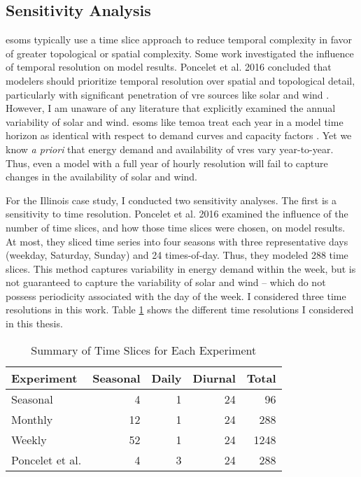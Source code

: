 \subsection{Sensitivity Analysis}

\glspl{esom} typically use a time slice approach to reduce temporal complexity
in favor of greater topological or spatial complexity. Some work investigated the
influence of temporal resolution on model results. Poncelet et al. 2016
concluded that modelers should prioritize temporal resolution over spatial and
topological detail, particularly with significant penetration of \gls{vre}
sources like solar and wind \cite{poncelet_impact_2016}. However,
I am unaware of any literature that explicitly examined the annual variability
of solar and wind. \glspl{esom} like \gls{temoa} treat each year in a model
time horizon as identical with respect to demand curves and capacity factors
\cite{hunter_modeling_2013}. Yet
we know \textit{a priori} that energy demand and availability of \glspl{vre}
vary year-to-year. Thus, even a model with a full year of hourly resolution
will fail to capture changes in the availability of solar and wind.

For the Illinois case study, I conducted two sensitivity analyses. The first is a
sensitivity to time resolution. Poncelet et al. 2016 examined the influence of
the number of time slices, and how those time slices were chosen, on model results.
At most, they sliced time series into four seasons with three representative days (weekday,
Saturday, Sunday) and 24 times-of-day. Thus, they modeled 288 time slices. This
method captures variability in energy demand within the week, but is not guaranteed
to capture the variability of solar and wind -- which do not possess periodicity
associated with the day of the week. I considered three time resolutions in this work.
Table \ref{tab:time-slice} shows the different time resolutions I considered in this thesis.

\begin{table}[H]
  \centering
  \caption{Summary of Time Slices for Each Experiment}
  \label{tab:time-slice}
  \begin{tabular}{lrrrr}
    \toprule
    Experiment & Seasonal & Daily & Diurnal & Total\\
    \midrule
    Seasonal & 4 & 1 & 24 & 96\\
    Monthly & 12 & 1 & 24 & 288\\
    Weekly & 52 & 1 & 24 & 1248\\
    \midrule
    Poncelet et al. \cite{poncelet_impact_2016} & 4 & 3 &  24 & 288\\
    \bottomrule
  \end{tabular}
\end{table}

